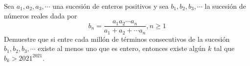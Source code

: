 Sea $a_1, a_2, a_3, \cdots$ una sucesión de enteros positivos y sea $b_1, b_2, b_3, \cdots$ la sucesión de números reales dada por
\[ b_n = \frac{a_1a_2 \cdots a_n}{a_1 + a_2 + \cdots a_n}, n \geq 1 \]
Demuestre que si entre cada millón de términos consecutivos de la sucesión $b_1, b_2, b_3, \cdots$ existe al menos uno que es entero, entonces existe algún $k$ tal que $b_k > 2021^{2021}$.
